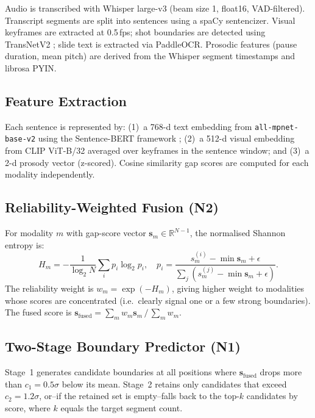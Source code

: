 \documentclass[conference]{IEEEtran}
\begin{document}
Audio is transcribed with Whisper large-v3 \cite{radford2022_whisper} (beam size 1,
float16, VAD-filtered). Transcript segments are split into sentences using a
spaCy sentencizer. Visual keyframes are extracted at 0.5\,fps; shot boundaries
are detected using TransNetV2 \cite{soucek2020_transnetv2}; slide text is extracted via
PaddleOCR. Prosodic features (pause duration, mean pitch) are derived from
the Whisper segment timestamps and librosa PYIN.

\subsection{Feature Extraction}

Each sentence is represented by: (1)~a 768-d text embedding from
\texttt{all-mpnet-base-v2} using the Sentence-BERT framework
\cite{reimers2019_sbert}; (2)~a 512-d visual embedding from
CLIP ViT-B/32 \cite{radford2021_clip} averaged over keyframes in the sentence window; and
(3)~a 2-d prosody vector (z-scored). Cosine similarity gap scores are computed
for each modality independently.

\subsection{Reliability-Weighted Fusion (N2)}

For modality $m$ with gap-score vector $\mathbf{s}_m \in \mathbb{R}^{N-1}$,
the normalised Shannon entropy is:
\[
  H_m = -\frac{1}{\log_2 N} \sum_{i} p_i \log_2 p_i, \quad
  p_i = \frac{s_m^{(i)} - \min \mathbf{s}_m + \epsilon}
             {\sum_j (s_m^{(j)} - \min \mathbf{s}_m + \epsilon)}.
\]
The reliability weight is $w_m = \exp(-H_m)$, giving higher weight to
modalities whose scores are concentrated (i.e.\ clearly signal one or
a few strong boundaries). The fused score is
$\mathbf{s}_\text{fused} = \sum_m w_m \mathbf{s}_m \,/\, \sum_m w_m$.

\subsection{Two-Stage Boundary Predictor (N1)}

Stage~1 generates candidate boundaries at all positions where
$\mathbf{s}_\text{fused}$ drops more than $c_1 = 0.5\sigma$ below its mean.
Stage~2 retains only candidates that exceed $c_2 = 1.2\sigma$, or--if the
retained set is empty--falls back to the top-$k$ candidates by score, where
$k$ equals the target segment count.
\end{document}
